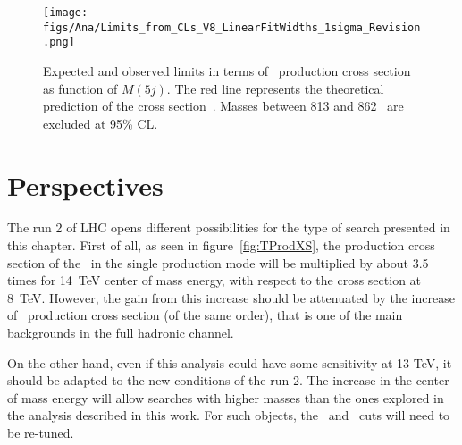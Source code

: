 \begin{figure}[!Hhtbp]
  \begin{center}
    \texttt{[image: figs/Ana/Limits\_from\_CLs\_V8\_LinearFitWidths\_1sigma\_Revision.png]}
    \caption{Expected and observed limits in terms of \Tp~production cross section as function of $M(5j)$. The red line represents the theoretical prediction of the cross section~\cite{Buchkremer:2013bha, Cacciapaglia:2011fx}. Masses between 813 and 862 \GeVcc~are excluded at 95\% CL.}
    \label{fig:Lim}
  \end{center}
\end{figure}

\section{Perspectives}
\label{sec:pers}

The run 2 of LHC opens different possibilities for the type of search presented in this chapter. First of all, as seen in figure~\ref{fig:TProdXS}, the production cross section of the \Tp~in the single production mode will be multiplied by about 3.5 times for 14~TeV center of mass energy, with respect to the cross section at 8~TeV. However, the gain from this increase should be attenuated by the increase of \ttbar~production cross section (of the same order), that is one of the main backgrounds in the full hadronic channel. 

On the other hand, even if this analysis could have some sensitivity at 13 TeV, it should be adapted to the new conditions of the run 2. The increase in the center of mass energy will allow searches with higher masses than the ones explored in the analysis described in this work. For such objects, the \pt~and \HT~cuts will need to be re-tuned. %

